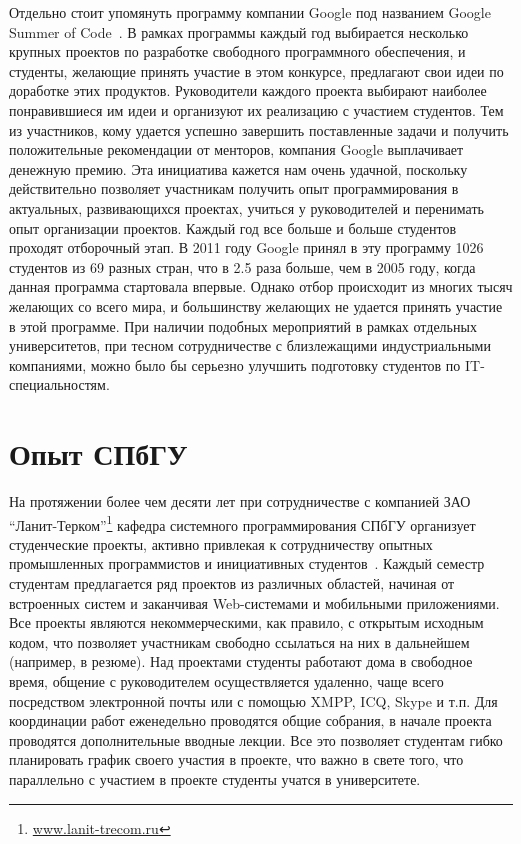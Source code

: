 \documentclass[a4paper]{article}
\begin{document}
Отдельно стоит упомянуть программу компании Google под названием Google Summer of Code~\cite{google}. В рамках программы каждый год выбирается несколько крупных проектов по разработке свободного программного обеспечения, и студенты, желающие принять участие в этом конкурсе, предлагают свои идеи по доработке этих продуктов. Руководители каждого проекта выбирают наиболее понравившиеся им идеи и организуют их реализацию с участием студентов. Тем из участников, кому удается успешно завершить поставленные задачи и получить положительные рекомендации от менторов, компания Google выплачивает денежную премию. Эта инициатива  кажется нам очень удачной, поскольку действительно позволяет участникам получить опыт программирования в актуальных, развивающихся проектах, учиться у руководителей и перенимать опыт организации проектов. Каждый год все больше и больше студентов проходят отборочный этап.  В 2011 году Google принял в эту программу 1026 студентов из 69 разных стран, что в 2.5 раза больше, чем в 2005 году, когда данная программа стартовала впервые. Однако отбор происходит из многих тысяч желающих со всего мира, и большинству желающих не удается принять участие в этой программе. При наличии подобных мероприятий в рамках отдельных университетов, при тесном сотрудничестве с близлежащими индустриальными компаниями, можно было бы серьезно улучшить подготовку студентов по IT-специальностям.

\section{Опыт СПбГУ}

На протяжении более чем десяти лет при сотрудничестве с компанией ЗАО ``Ланит-Терком''\footnote{\url{www.lanit-trecom.ru}} кафедра системного программирования СПбГУ организует студенческие проекты, активно привлекая к сотрудничеству опытных промышленных программистов и инициативных студентов~\cite{gagarsky, saratov, terekhov3}. Каждый семестр студентам предлагается ряд проектов из различных областей, начиная от встроенных систем и заканчивая Web-системами и мобильными приложениями. Все проекты являются некоммерческими, как правило, с открытым исходным кодом, что позволяет участникам свободно ссылаться на них  в дальнейшем (например, в резюме). Над проектами студенты работают дома в свободное время, общение с руководителем осуществляется удаленно, чаще всего посредством электронной почты или с помощью XMPP, ICQ, Skype и т.п. Для координации работ еженедельно проводятся общие собрания, в начале проекта проводятся дополнительные вводные лекции. Все это позволяет студентам гибко планировать график своего участия в проекте, что важно в свете того, что параллельно с участием в проекте студенты учатся в университете. 
\end{document}
